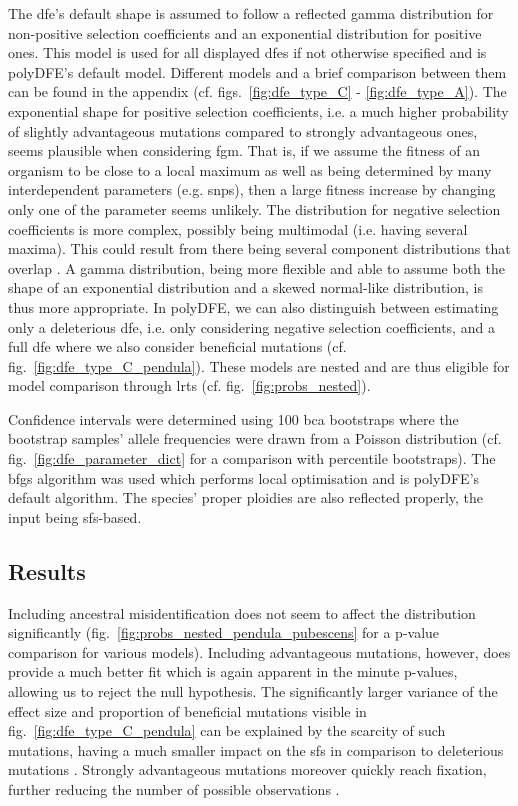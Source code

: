 \documentclass[hidelinks,11pt]{article}
\begin{document}
    The \acrshort{dfe}'s default shape is assumed to follow a reflected gamma distribution for non-positive selection coefficients and an exponential distribution for positive ones. This model is used for all displayed \acrshort{dfe}s if not otherwise specified and is polyDFE's default model. Different models and a brief comparison between them can be found in the appendix (cf. figs.~\ref{fig:dfe_type_C} - \ref{fig:dfe_type_A}). The exponential shape for positive selection coefficients, i.e. a much higher probability of slightly advantageous mutations compared to strongly advantageous ones, seems plausible when considering \acrfull{fgm}. That is, if we assume the fitness of an organism to be close to a local maximum as well as being determined by many interdependent parameters (e.g. \acrshort{snp}s), then a large fitness increase by changing only one of the parameter seems unlikely. The distribution for negative selection coefficients is more complex, possibly being multimodal (i.e. having several maxima). This could result from there being several component distributions that overlap \cite{dfe-review}. A gamma distribution, being more flexible and able to assume both the shape of an exponential distribution and a skewed normal-like distribution, is thus more appropriate. In polyDFE, we can also distinguish between estimating only a deleterious \acrshort{dfe}, i.e. only considering negative selection coefficients, and a full \acrshort{dfe} where we also consider beneficial mutations (cf. fig.~\ref{fig:dfe_type_C_pendula}). These models are nested and are thus eligible for model comparison through \acrlong{lrt}s (cf. fig.~\ref{fig:probs_nested}).

    Confidence intervals were determined using 100 \acrfull{bca} bootstraps where the bootstrap samples' allele frequencies were drawn from a Poisson distribution (cf. fig.~\ref{fig:dfe_parameter_dict} for a comparison with percentile bootstraps). The \acrshort{bfgs} algorithm was used which performs local optimisation and is polyDFE's default algorithm. The species' proper ploidies are also reflected properly, the input being \acrshort{sfs}-based.

    \subsection{Results}

    Including ancestral misidentification does not seem to affect the distribution significantly (fig.~\ref{fig:probs_nested_pendula_pubescens} for a p-value comparison for various models). Including advantageous mutations, however, does provide a much better fit which is again apparent in the minute p-values, allowing us to reject the null hypothesis. The significantly larger variance of the effect size and proportion of beneficial mutations visible in fig.~\ref{fig:dfe_type_C_pendula} can be explained by the scarcity of such mutations, having a much smaller impact on the \acrshort{sfs} in comparison to deleterious mutations \cite{dfe-plants}. Strongly advantageous mutations moreover quickly reach fixation, further reducing the number of possible observations \cite{polydfe}.
\end{document}
